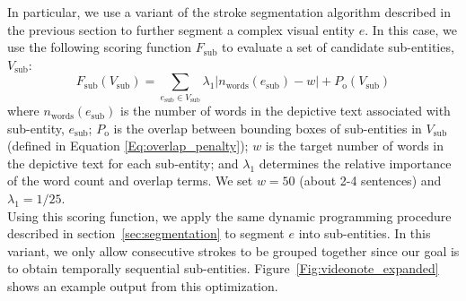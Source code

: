 In particular, we use a variant of the stroke segmentation algorithm described in the previous section to further segment a complex visual entity $e$.
%
In this case, we use the following scoring function $F_\text{sub}$ to evaluate a set of candidate sub-entities, $V_\text{sub}$:
%
\begin{equation} F_\text{sub}(V_\text{sub}) = \sum_{e_\text{sub} \in V_\text{sub}}\lambda_{1}\lvert n_\text{words}(e_\text{sub}) - w \rvert + P_\text{o}(V_\text{sub}) \end{equation} 
%
where $n_\text{words}(e_\text{sub})$ is the number of words in the depictive text associated with sub-entity, $e_\text{sub}$; $P_\text{o}$ is the overlap between bounding boxes of sub-entities in $V_\text{sub}$ (defined in Equation \ref{Eq:overlap_penalty}); $w$ is the target number of words in the depictive text for each sub-entity; and $\lambda_{1}$ determines the relative importance of the word count and overlap terms. We set $w = 50$ (about 2-4 sentences) and $\lambda_{1} = 1/25$.\\

Using this scoring function, we apply the same dynamic programming procedure described in section~\ref{sec:segmentation} to segment $e$ into sub-entities. In this variant, we only allow consecutive strokes to be grouped together since our goal is to obtain temporally sequential sub-entities. Figure~\ref{Fig:videonote_expanded} shows an example output from this optimization.  
